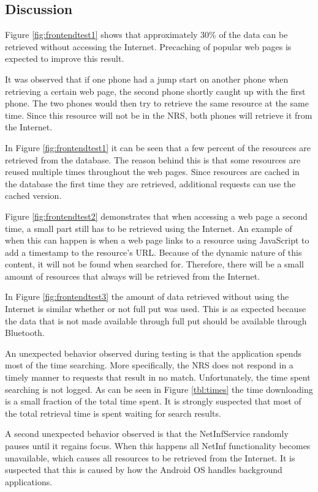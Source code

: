 \subsection{Discussion}

Figure \ref{fig:frontendtest1} shows that approximately 30\% of the data 
can be retrieved without accessing the Internet. Precaching of popular web pages is expected to improve this result.

It was observed that if one phone had a jump start on another phone when retrieving a certain web page, 
the second phone shortly caught up with the first phone. The two phones would then try to retrieve the same resource 
at the same time. Since this resource will not be in the NRS, both phones will retrieve it from the Internet.

In Figure \ref{fig:frontendtest1} it can be seen that a few percent of the resources are retrieved from the 
database. The reason behind this is that some resources are reused multiple times throughout the web pages. 
Since resources are cached in the database the first time they are retrieved, additional requests can use the cached version.

Figure \ref{fig:frontendtest2} demonstrates that when accessing a web page a second time, a small part still has to be 
retrieved using the Internet. An example of when this can happen is when a web page links to a resource using JavaScript 
to add a timestamp to the resource's URL. Because of the dynamic nature of this content, it will not be found when searched for. Therefore, there will be a small amount of resources that always will be retrieved from the Internet.

In Figure \ref{fig:frontendtest3} the amount of data retrieved without using the Internet is similar 
whether or not full put was used. This is as expected because the data that is not made available through full put should 
be available through Bluetooth. 

An unexpected behavior observed during testing is that the application spends most of the time searching. More specifically, the NRS does not respond in a timely manner to requests that result in no match. Unfortunately, the time spent searching is not logged. As can be seen in Figure \ref{tbl:times} the time downloading is a small fraction of the total time spent. It is strongly suspected that most of the total retrieval time is spent waiting for search results.

A second unexpected behavior observed is that the NetInfService randomly pauses until it regains focus. When this happens all NetInf functionality becomes unavailable, which causes all resources to be retrieved from the Internet. It is suspected that this is caused by how the Android OS handles background applications.

